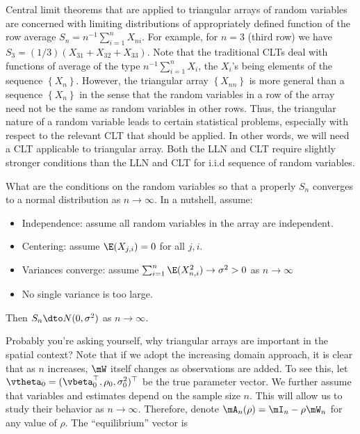 \documentclass[english,12pt]{book}\usepackage[]{graphicx}\usepackage[]{xcolor}
\begin{document}
Central limit theorems that are applied to triangular arrays of random variables are concerned with limiting distributions of appropriately defined function of the row average $S_n = n^{-1}\sum_{i = 1}^nX_{ni}$. For example, for $n = 3$ (third row) we have $S_3 = (1/3)(X_{31} + X_{32} + X_{33})$.  Note that the traditional CLTs deal with functions of average of the type $n^{-1}\sum_{i = 1}^n X_i$, the $X_i$'s being elements of the sequence $\left\lbrace X_n\right\rbrace$. However, the triangular array $\left\lbrace X_{nn}\right\rbrace$ is more general than a sequence $\left\lbrace X_n\right\rbrace$ in the sense that the random variables in a row of the array need not be the same as random variables in other rows. Thus, the triangular nature of a random variable leads to certain statistical problems, especially with respect to the relevant CLT that should be applied. In other words, we will need a CLT applicable to triangular array. Both the LLN and CLT require slightly stronger conditions than the LLN and CLT for i.i.d sequence of random variables. 

What are the conditions on the random variables so that a properly $S_n$ converges to a normal distribution as $n\to \infty$. In a nutshell, assume: 

\begin{itemize}
  \item Independence: assume all random variables in the array are independent.
  \item Centering: assume $\E(X_{j,i}) = 0$ for all $j, i$.
  \item Variances converge: assume $\sum_{i = 1}^n\E(X_{n, i}^2)\to \sigma^2> 0$ as $n\to\infty$
  \item No single variance is too large.
\end{itemize}

Then $S_n \dto N(0, \sigma^2)$ as $n\to\infty$.

Probably you're asking yourself, why triangular arrays are important in the spatial context? Note that if we adopt the increasing domain approach, it is clear that as $n$ increases,  $\mW$ itself changes as observations are added. To see this,  let $\vtheta_0 = (\vbeta_0^\top, \rho_0, \sigma_0^2)^\top$ be the true parameter vector. We further assume that variables and estimates depend on the sample size $n$. This will allow us to study their behavior as $n\to \infty$.  Therefore, denote $\mA_n(\rho) = \mI_n - \rho \mW_n$ for any value of $\rho$. The ``equilibrium'' vector is
\end{document}
